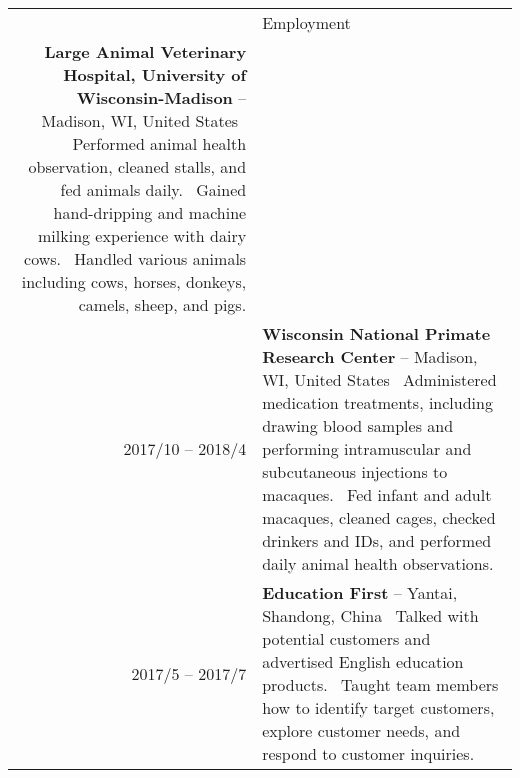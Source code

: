 \documentclass[letterpaper, 11pt]{article}
\newcommand{\headingfont}{\Large\color{OliveGreen}}
\newenvironment{SectionTable}[1]{
	\renewcommand*{\arraystretch}{1.7}
	\setlength{\tabcolsep}{10pt}
	\begin{longtable}{Rp{5.2in}} & #1 \\}
{\end{longtable}\vspace{-.3cm}}
\begin{document}
\begin{SectionTable}{\headingfont Employment}
\textbf{Large Animal Veterinary Hospital, University of Wisconsin-Madison} \newline
{} -- Madison, WI, United States \newline
\textbullet\, Performed animal health observation, cleaned stalls, and fed animals daily. \newline
\textbullet\, Gained hand-dripping and machine milking experience with dairy cows. \newline 
\textbullet\, Handled various animals including cows, horses, donkeys, camels, sheep, and pigs. \\
2017/10 -- 2018/4 &
\textbf{Wisconsin National Primate Research Center} \newline
{} -- Madison, WI, United States \newline
\textbullet\, Administered medication treatments, including drawing blood samples and performing intramuscular and subcutaneous injections to macaques. \newline
\textbullet\, Fed infant and adult macaques, cleaned cages, checked drinkers and IDs, and performed daily animal health observations. \\
2017/5 -- 2017/7 &
\textbf{Education First} \newline
{} -- Yantai, Shandong, China \newline
\textbullet\, Talked with potential customers and advertised English education products. \newline
\textbullet\, Taught team members how to identify target customers, explore customer needs, and respond to customer inquiries. \\
\end{SectionTable}
\end{document}
